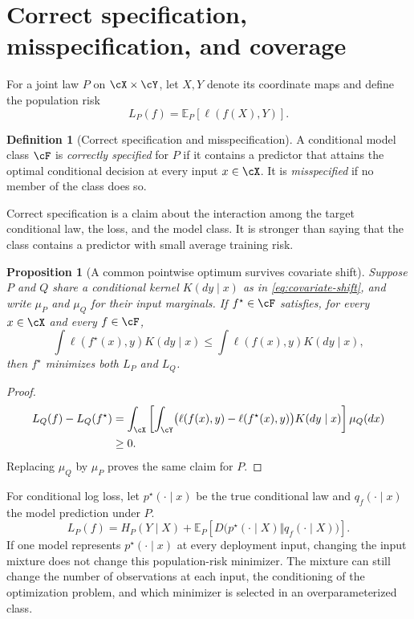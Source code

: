 \documentclass[11pt,twoside]{article}
\newcommand{\E}{\mathbb E}
\newcommand{\KL}{D}
\newtheorem{proposition}[theorem]{Proposition}
\theoremstyle{definition}
\newtheorem{definition}[theorem]{Definition}
\theoremstyle{remark}
\begin{document}
\section{Correct specification, misspecification, and coverage}
\label{sec:specification}

For a joint law $P$ on $\cX\times\cY$, let $X,Y$ denote its coordinate maps
and define the population risk
\[
 L_P(f)=\E_P[\ell(f(X),Y)].
\]

\begin{definition}[Correct specification and misspecification]
A conditional model class $\cF$ is \emph{correctly specified} for $P$ if it
contains a predictor that attains the optimal conditional decision at every
input $x\in\cX$. It is \emph{misspecified} if no member of the class does so.
\end{definition}

Correct specification is a claim about the interaction among the target
conditional law, the loss, and the model class. It is stronger than saying
that the class contains a predictor with small average training risk.

\begin{proposition}[A common pointwise optimum survives covariate shift]
\label{prop:pointwise-optimum}
Suppose $P$ and $Q$ share a conditional kernel $K(dy\mid x)$ as in
\cref{eq:covariate-shift}, and write $\mu_P$ and $\mu_Q$ for their input
marginals. If $f^\star\in\cF$ satisfies, for every
$x\in\cX$ and every $f\in\cF$,
\[
 \int \ell(f^\star(x),y)K(dy\mid x)
 \le \int \ell(f(x),y)K(dy\mid x),
\]
then $f^\star$ minimizes both $L_P$ and $L_Q$.
\end{proposition}

\begin{proof}
\begin{align*}
L_Q(f)-L_Q(f^\star)
&=\int_{\cX}\left[
  \int_{\cY}\bigl(\ell(f(x),y)-\ell(f^\star(x),y)\bigr)K(dy\mid x)
  \right]\mu_Q(dx)\\
&\ge0.
\end{align*}
Replacing $\mu_Q$ by $\mu_P$ proves the same claim for $P$.
\end{proof}

For conditional log loss, let $p^\star(\cdot\mid x)$ be the true conditional
law and $q_f(\cdot\mid x)$ the model prediction under $P$.
\begin{equation}
L_P(f)=H_P(Y\mid X)+
\E_P\!\left[
\KL\bigl(p^\star(\cdot\mid X)\Vert q_f(\cdot\mid X)\bigr)
\right].
\label{eq:conditional-logloss}
\end{equation}
If one model represents $p^\star(\cdot\mid x)$ at every deployment input,
changing the input mixture does not change this population-risk minimizer. The
mixture can still change the number of observations at each input, the
conditioning of the optimization problem, and which minimizer is selected in an
overparameterized class.
\end{document}
